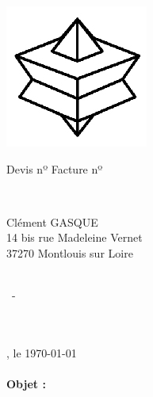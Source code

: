 %
    \noindent
    \begin{minipage}[t]{2cm}
        \vfill
        \includegraphics{.input/logo.jpg}                                   %
        \vfill
    \end{minipage}
    \begin{minipage}[t]{14cm}
        \flushright
            {Devis nº\FactureNum}
            {Facture nº\FactureNum}
        \vfill
    \end{minipage}
    \\
%
    \begin{minipage}[t]{9.5cm}
        \vspace{5mm}
        Clément GASQUE \\                                                   %
        14 bis rue Madeleine Vernet \\
        37270 Montlouis sur Loire \\
    \end{minipage}
    \begin{minipage}[t]{6cm}
        \vspace{1.5cm}
            \textbf{\ClientNom}                                             %
            \begin{changeLmargin}{1mm}
                \ClientAdresseRue\\
                \ClientAdresseCodePostal\ - \ClientAdresseVille\\
                \ClientAdressePays\\
            \end{changeLmargin}
        \vfill
    \end{minipage}
    \\
    {\FactureLieu, le \today}\\\\                                           %
    \textbf{Objet : \FactureObjet}                                          %
